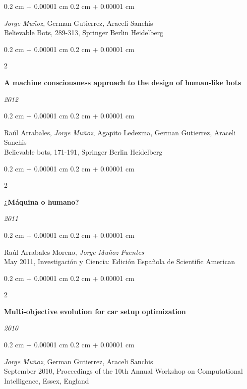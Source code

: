 \documentclass[10pt, letterpaper]{article}
\newenvironment{onecolentry}{
	\begin{adjustwidth}{
		0.2 cm + 0.00001 cm
	}{
		0.2 cm + 0.00001 cm
	}
	}{
	\end{adjustwidth}
} %
\newenvironment{twocolentry}[2][]{
	\onecolentry
	\def\secondColumn{#2}
	\setcolumnwidth{\fill, 5.5 cm}
	\begin{paracol}{2}
	}{
		\switchcolumn \raggedleft \secondColumn
	\end{paracol}
	\endonecolentry
} %
\begin{document}
	\vspace{0.10 cm}
	\begin{onecolentry}
		\textit{Jorge Muñoz}, German Gutierrez, Araceli Sanchis\\
		Believable Bots, 289-313, Springer Berlin Heidelberg
	\end{onecolentry}

	\vspace{0.10 cm}

	\begin{twocolentry}{
		\textit{2012}}
		\textbf{A machine consciousness approach to the design of human-like bots}
	\end{twocolentry}

	\vspace{0.10 cm}
	\begin{onecolentry}
		Raúl Arrabales, \textit{Jorge Muñoz}, Agapito Ledezma, German Gutierrez, Araceli Sanchis\\
		Believable bots, 171-191, Springer Berlin Heidelberg
	\end{onecolentry}

	\vspace{0.2 cm}

	\begin{twocolentry}{
		\textit{2011}}
		\textbf{¿Máquina o humano?}
	\end{twocolentry}

	\vspace{0.10 cm}
	\begin{onecolentry}
		Raúl Arrabales Moreno, \textit{Jorge Muñoz Fuentes}\\
		May 2011, Investigación y Ciencia: Edición Española de Scientific American
	\end{onecolentry}

	\vspace{0.2 cm}

	\begin{twocolentry}{
		\textit{2010}}
		\textbf{Multi-objective evolution for car setup optimization}
	\end{twocolentry}

	\vspace{0.10 cm}
	\begin{onecolentry}
		\textit{Jorge Muñoz}, German Gutierrez, Araceli Sanchis\\
		September 2010, Proceedings of the 10th Annual Workshop on Computational Intelligence, Essex, England
	\end{onecolentry}

	\vspace{0.10 cm}
\end{document}
